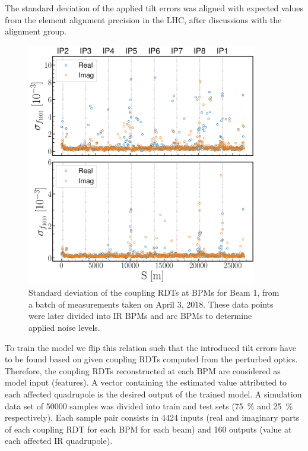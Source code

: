 The standard deviation of the applied tilt errors was aligned with expected values from the element alignment precision in the LHC, after discussions with the alignment group. 

\begin{figure}[!htb]
    \centering
    \includegraphics*[width=0.9\textwidth]{Figures/ML_for_IR_Coupling/rdts_stdev_batch.pdf}
    \caption{Standard deviation of the coupling RDTs at BPMs for Beam 1, from a batch of measurements taken on April 3, 2018. These data points were later divided into IR BPMs and arc BPMs to determine applied noise levels.}
    \label{fig:rdts_stdev_batch}
\end{figure}

To train the model we flip this relation such that the introduced tilt errors have to be found based on given coupling RDTs computed from the perturbed optics.
Therefore, the coupling RDTs reconstructed at each BPM are considered as model input (features).
A vector containing the estimated \DPSI value attributed to each affected quadrupole is the desired output of the trained model.
A simulation data set of \num{50000} samples was divided into train and test sets (\qty{75}{\percent} and \qty{25}{\percent} respectively).
Each sample pair consists in \num{4424} inputs (real and imaginary parts of each coupling RDT for each BPM for each beam) and \num{160} outputs (\DPSI value at each affected IR quadrupole).

